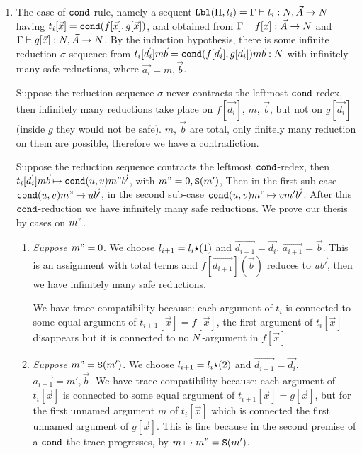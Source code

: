 \documentclass{article}
\newenvironment{proof}[1][Proof]{\begin{trivlist}
\item[\hskip \labelsep {\bfseries #1}]}{\end{trivlist}}
\begin{document}
\begin{proof}
\begin{enumerate}

\item
  The case of ${\tt cond}$-rule, namely a sequent
  ${\tt Lbl}(\Pi,l_i) = \Gamma\vdash t_i:{N},\vec{A}\rightarrow{N}$
  having $t_i[\vec{x}] = {\tt cond}(f[\vec{x}],g[\vec{x}])$,
  and obtained from 
  $\Gamma\vdash f[\vec{x}]:\vec{A}\rightarrow{N}$
  and
  $\Gamma\vdash g[\vec{x}]:{N},\vec{A}\rightarrow{N}$. 
  By the induction hypothesis, there is some infinite reduction $\sigma$ sequence from
  $t_i[\vec{d_i}]m \vec{b} = {\tt cond}(f[\vec{d_i}],g[\vec{d_i}])m\vec{b}:{N}$
  with infinitely many safe reductions,
  where $\vec{a_i} = m,\vec{b}$. 

  Suppose the reduction sequence $\sigma$ never contracts
  the leftmost ${\tt cond}$-redex, then infinitely many reductions take place on $f[\vec{d_i}]$, 
  $m$, $\vec{b}$, but not on $g[\vec{d_i}]$ (inside $g$ they would not be safe).
  $m$, $\vec{b}$ are total, only finitely many reduction on them are possible, 
  therefore we have a contradiction.


  Suppose the reduction sequence contracts the leftmost ${\tt cond}$-redex, then 
  $t_i[\vec{d_i}]m \vec{b} \mathbin{\mapsto} {\tt cond}(u,v)m"\vec{b'}$, with $m"=0, {\tt S}(m')$,
  Then  in the first sub-case ${\tt cond}(u,v)m" \mathbin{\mapsto} u \vec{b'}$, in the second sub-case
  ${\tt cond}(u,v)m" \mathbin{\mapsto} v m' \vec{b'}$. 
  After this ${\tt cond}$-reduction we have infinitely many safe reductions.
  We prove our thesis by cases on $m"$.

\begin{enumerate}
\item
  \emph{Suppose $m" = 0$}.
  We choose $l_{i+1} = l_i {\star} (1)$ and $\vec{d_{i+1}} = \vec{d_i}$,
  $\vec{a_{i+1}} = \vec{b}$. This is an assignment with total terms and $f[\vec{d_{i+1}}](\vec{b})$
  reduces to $u \vec{b'}$, then we have infinitely many safe reductions.

  We have trace-compatibility because: 
    each argument of $t_i$ is connected to some equal argument of $t_{i+1}[\vec{x}]=f[\vec{x}]$,
    the first argument of $t_i[\vec{x}]$ disappears but it is connected to no ${N}$-argument in $f[\vec{x}]$.

 \item
  \emph{Suppose $m" = {\tt S}(m')$}. 
  We choose $l_{i+1} = l_i {\star} (2)$ and $\vec{d_{i+1}} = \vec{d_i}$,
  $\vec{a_{i+1}} = m',\vec{b}$.
  We have trace-compatibility because: 
  each argument of $t_i[\vec{x}]$ is connected to some equal argument of 
    $t_{i+1}[\vec{x}]=g[\vec{x}]$,
    but for the first unnamed argument $m$ of $t_i[\vec{x}]$ 
    which is connected the first unnamed argument of $g[\vec{x}]$.
    This is fine because in the second premise of a ${\tt cond}$ 
    the trace progresses, by $m \mathbin{\mapsto}  m" = {\tt S}(m')$.


\end{enumerate}
\end{enumerate}
\end{proof}
\end{document}
